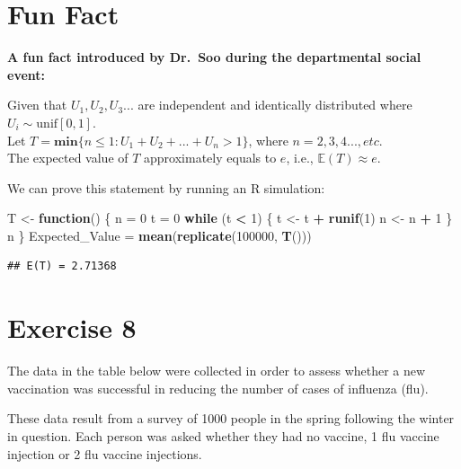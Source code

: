 \documentclass[
]{book}
\newenvironment{Shaded}{\begin{snugshade}}{\end{snugshade}}
\newcommand{\ControlFlowTok}[1]{\textcolor[rgb]{0.13,0.29,0.53}{\textbf{#1}}}
\newcommand{\DecValTok}[1]{\textcolor[rgb]{0.00,0.00,0.81}{#1}}
\newcommand{\FunctionTok}[1]{\textcolor[rgb]{0.13,0.29,0.53}{\textbf{#1}}}
\newcommand{\NormalTok}[1]{#1}
\newcommand{\OtherTok}[1]{\textcolor[rgb]{0.56,0.35,0.01}{#1}}
\newcommand{\SpecialCharTok}[1]{\textcolor[rgb]{0.81,0.36,0.00}{\textbf{#1}}}
\begin{document}
\chapter{Fun Fact}\label{fun-fact}

\textbf{A fun fact introduced by Dr.~Soo during the departmental social event:}

Given that \(U_1, U_2, U_3...\) are independent and identically distributed where \(U_i \sim \text{unif}[0,1]\).\\
Let \(T = \textbf{min}\{n \leq 1: U_1 + U_2 + ... + U_n > 1\}\), where \(n = 2, 3, 4..., etc\).\\
The expected value of \(T\) approximately equals to \(e\), i.e., \(\mathbb{E}(T) \approx e\).

We can prove this statement by running an R simulation:

\begin{Shaded}
\begin{Highlighting}[]
\NormalTok{T }\OtherTok{\textless{}{-}} \ControlFlowTok{function}\NormalTok{() \{}
\NormalTok{  n }\OtherTok{=} \DecValTok{0}
\NormalTok{  t }\OtherTok{=} \DecValTok{0}
  \ControlFlowTok{while}\NormalTok{ (t }\SpecialCharTok{\textless{}} \DecValTok{1}\NormalTok{) \{}
\NormalTok{    t }\OtherTok{\textless{}{-}}\NormalTok{ t }\SpecialCharTok{+} \FunctionTok{runif}\NormalTok{(}\DecValTok{1}\NormalTok{)}
\NormalTok{    n }\OtherTok{\textless{}{-}}\NormalTok{ n }\SpecialCharTok{+} \DecValTok{1}
\NormalTok{  \}}
\NormalTok{  n}
\NormalTok{\}}
\NormalTok{Expected\_Value }\OtherTok{=} \FunctionTok{mean}\NormalTok{(}\FunctionTok{replicate}\NormalTok{(}\DecValTok{100000}\NormalTok{, }\FunctionTok{T}\NormalTok{()))}
\end{Highlighting}
\end{Shaded}

\begin{verbatim}
## E(T) = 2.71368
\end{verbatim}

\chapter{Exercise 8}\label{exercise-8}

The data in the table below were collected in order to assess whether a new vaccination was
successful in reducing the number of cases of influenza (flu).

These data result from a survey of 1000 people in the spring following the winter in question. Each
person was asked whether they had no vaccine, 1 flu vaccine injection or 2 flu vaccine injections.
\end{document}
